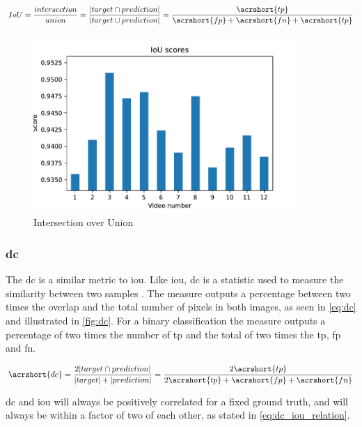 \begin{equation}
    IoU = \frac{intersection}{union} = \frac{|target \cap prediction|}{|target \cup prediction|} = \frac{\acrshort{tp}}{\acrshort{fp} + \acrshort{fn} + \acrshort{tp}}
\end{equation}


\begin{figure}[H]
  \centering
  \includegraphics[width=0.9\textwidth]{img/objective_measures/iou.pdf}
  \caption{Intersection over Union}
  \label{fig:iou}
\end{figure}

\subsubsection{\acrlong{dc}}
The \acrfull{dc} is a similar metric to \acrlong{iou}. Like \acrlong{iou}, \acrlong{dc} is a statistic used to measure the similarity between two samples \cite{sorensen}\cite{dice}. The measure outputs a percentage between two times the overlap and the total number of pixels in both images, as seen in \autoref{eq:dc} and illustrated in \autoref{fig:dc}. For a binary classification the measure outputs a percentage of two times the number of \acrlong{tp} and the total of two times the \acrlong{tp}, \acrlong{fp} and \acrlong{fn}.

\begin{equation}\label{eq:dc}
    \acrshort{dc} =  \frac{2|target \cap prediction|}{|target| + |prediction|} = \frac{2\acrshort{tp}}{2\acrshort{tp}+ \acrshort{fp} + \acrshort{fn}}
\end{equation}

\acrlong{dc} and \acrlong{iou} will always be positively correlated for a fixed ground truth, and will always be within a factor of two of each other, as stated in \autoref{eq:dc_iou_relation}.

